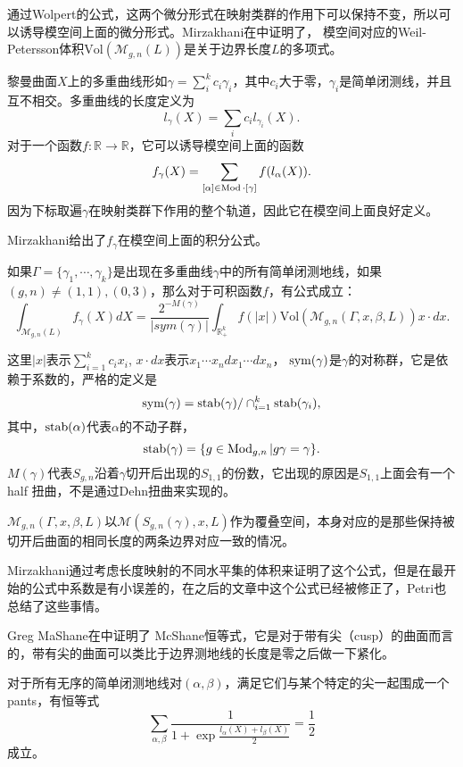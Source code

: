 通过Wolpert的公式，这两个微分形式在映射类群的作用下可以保持不变，所以可以诱导模空间上面的微分形式。Mirzakhani在\cite{Mirzakhani:2006fta}中证明了， 模空间对应的Weil-Petersson体积$\mathrm{Vol}(\mathscr{M}_{g,n}(L))$是关于边界长度$L$的多项式。

黎曼曲面$X$上的多重曲线形如$\gamma=\sum_{i}^kc_i\gamma_i$，其中$c_i$大于零，$\gamma_i$是简单闭测线，并且互不相交。多重曲线的长度定义为$$
l_\gamma(X)=\sum_{i}c_il_{\gamma_i}(X).
$$
对于一个函数$f:\mathbb{R}\to \mathbb{R}$，它可以诱导模空间上面的函数$$
f_\gamma(X)=\sum_{[\alpha]\in \operatorname{Mod}\cdot [\gamma]}f(l_\alpha(X)).
$$
因为下标取遍$\gamma$在映射类群下作用的整个轨道，因此它在模空间上面良好定义。

Mirzakhani给出了$f_\gamma$在模空间上面的积分公式。

\begin{thmb}[Mirzakhani积分公式]
如果$\Gamma=\{\gamma_1,\cdots,\gamma_k\}$是出现在多重曲线$\gamma$中的所有简单闭测地线，如果$(g,n)\neq (1,1),(0,3)$，那么对于可积函数$f$，有公式成立：
 $$
 \int_{\mathscr{M}_{g,n}(L)}f_\gamma(X)dX=\frac{2^{-M(\gamma)}}{|sym(\gamma)|}\int_{\mathbb{R}_+^k}f(|x|)\mathrm{Vol}(\mathscr{M}_{g,n}(\Gamma,x,\beta,L))x\cdot dx.
 $$

\end{thmb}

这里$|x|$表示$\sum_{i=1}^kc_ix_i$, $x\cdot dx$表示$x_1\cdots x_ndx_1\cdots dx_n$， $\operatorname{sym}(\gamma)$是$\gamma$的对称群，它是依赖于系数的，严格的定义是$$
  \operatorname{sym}(\gamma)=\operatorname{stab}(\gamma)/\cap_{i=1}^k \operatorname{stab}(\gamma_i),
  $$
其中，$\operatorname{stab}(\alpha)$代表$\alpha$的不动子群， $$
 \operatorname{stab}(\gamma)=\{g\in \operatorname{Mod}_{g,n}|g\gamma=\gamma\}.
 $$
 $M(\gamma)$代表$S_{g,n}$沿着$\gamma$切开后出现的$S_{1,1}$的份数，它出现的原因是$S_{1,1}$上面会有一个half 扭曲，不是通过Dehn扭曲来实现的。
 
$\mathscr{M}_{g,n}(\Gamma,x,\beta,L)$以$\mathscr{M}(S_{g,n}(\gamma),x,L)$作为覆叠空间，本身对应的是那些保持被切开后曲面的相同长度的两条边界对应一致的情况。

Mirzakhani通过考虑长度映射的不同水平集的体积来证明了这个公式，但是在\cite{Mirzakhani:2006fta}最开始的公式中系数是有小误差的，在之后的文章中这个公式已经被修正了，Petri也总结了这些事情\cite{Teithe}。

Greg MaShane在\cite{McShane1998SimpleGA}中证明了 McShane恒等式，它是对于带有尖（cusp）的曲面而言的，带有尖的曲面可以类比于边界测地线的长度是零之后做一下紧化。

\begin{thmb}[McShane恒等式]
对于所有无序的简单闭测地线对$(\alpha,\beta)$，满足它们与某个特定的尖一起围成一个pants，有恒等式$$
\sum_{\alpha,\beta}\frac{1}{1+\exp{\frac{l_\alpha(X)+l_\beta(X)}{2}}}=\frac{1}{2}
$$成立。
\end{thmb}


